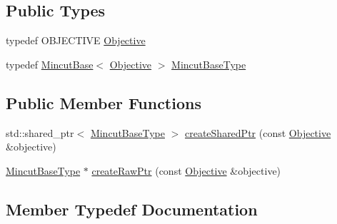 \subsection*{Public Types}
\begin{DoxyCompactItemize}
\item 
typedef O\+B\+J\+E\+C\+T\+I\+V\+E \hyperlink{classnifty_1_1graph_1_1optimization_1_1mincut_1_1PyMincutFactoryBase_a5d3166bb3c9c2330cce56c2a6273ffce}{Objective}
\item 
typedef \hyperlink{classnifty_1_1graph_1_1optimization_1_1mincut_1_1MincutBase}{Mincut\+Base}$<$ \hyperlink{classnifty_1_1graph_1_1optimization_1_1mincut_1_1MincutFactoryBase_a8ee3aff3639d955ad46ddeb2836db891}{Objective} $>$ \hyperlink{classnifty_1_1graph_1_1optimization_1_1mincut_1_1PyMincutFactoryBase_a701ed7a4f135e2435ad01f7d27a9fe5b}{Mincut\+Base\+Type}
\end{DoxyCompactItemize}
\subsection*{Public Member Functions}
\begin{DoxyCompactItemize}
\item 
std\+::shared\+\_\+ptr$<$ \hyperlink{classnifty_1_1graph_1_1optimization_1_1mincut_1_1MincutFactoryBase_a42de59d331b39b682640cc9efda199a7}{Mincut\+Base\+Type} $>$ \hyperlink{classnifty_1_1graph_1_1optimization_1_1mincut_1_1PyMincutFactoryBase_a8bfe09d94839ce42210150f3a3e408d6}{create\+Shared\+Ptr} (const \hyperlink{classnifty_1_1graph_1_1optimization_1_1mincut_1_1MincutFactoryBase_a8ee3aff3639d955ad46ddeb2836db891}{Objective} \&objective)
\item 
\hyperlink{classnifty_1_1graph_1_1optimization_1_1mincut_1_1MincutFactoryBase_a42de59d331b39b682640cc9efda199a7}{Mincut\+Base\+Type} $\ast$ \hyperlink{classnifty_1_1graph_1_1optimization_1_1mincut_1_1PyMincutFactoryBase_a32c23aad5d0368e90c29ecc0fd257db1}{create\+Raw\+Ptr} (const \hyperlink{classnifty_1_1graph_1_1optimization_1_1mincut_1_1MincutFactoryBase_a8ee3aff3639d955ad46ddeb2836db891}{Objective} \&objective)
\end{DoxyCompactItemize}


\subsection{Member Typedef Documentation}
\hypertarget{classnifty_1_1graph_1_1optimization_1_1mincut_1_1PyMincutFactoryBase_a701ed7a4f135e2435ad01f7d27a9fe5b}{}
